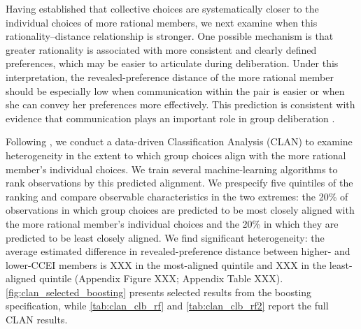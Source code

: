 \documentclass[11 pt]{article}
\begin{document}
Having established that collective choices are systematically closer to the individual choices of more rational members, we next examine when this rationality--distance relationship is stronger. One possible mechanism is that greater rationality is associated with more consistent and clearly defined preferences, which may be easier to articulate during deliberation. Under this interpretation, the revealed-preference distance of the more rational member should be especially low when communication within the pair is easier or when she can convey her preferences more effectively. This prediction is consistent with evidence that communication plays an important role in group deliberation \citep[e.g.,][]{burnstein1975what, goeree2011experimental}.

Following \citet{chernozhukov2018generic}, we conduct a data-driven Classification Analysis (CLAN) to examine heterogeneity in the extent to which group choices align with the more rational member's individual choices. We train several machine-learning algorithms to rank observations by this predicted alignment. We prespecify five quintiles of the ranking and compare observable characteristics in the two extremes: the 20\% of observations in which group choices are predicted to be most closely aligned with the more rational member's individual choices and the 20\% in which they are predicted to be least closely aligned. We find significant heterogeneity: the average estimated difference in revealed-preference distance between higher- and lower-CCEI members is XXX in the most-aligned quintile and XXX in the least-aligned quintile (Appendix Figure XXX; Appendix Table XXX). \autoref{fig:clan_selected_boosting} presents selected results from the boosting specification, while \autoref{tab:clan_clb_rf} and \autoref{tab:clan_clb_rf2} report the full CLAN results.

\end{document}
